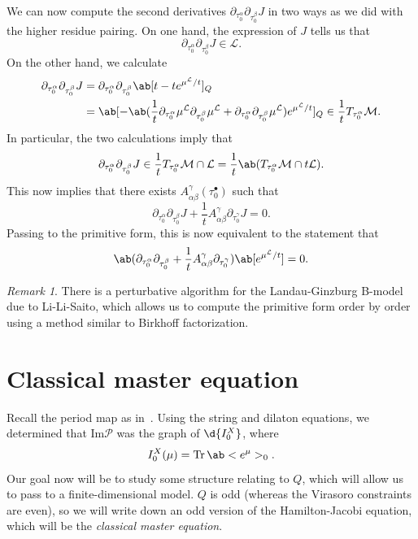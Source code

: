 \documentclass{amsart}
\theoremstyle{definition}
\theoremstyle{remark}
\newtheorem{rmk}[thm]{Remark}
\theoremstyle{plain}
\theoremstyle{definition}
\theoremstyle{remark}
\newcommand{\Ima}{\mathrm{Im}}
\newcommand{\mc}[1]{\mathcal{#1}}
\newcommand{\on}[1]{\operatorname{#1}}
\newcommand{\1}{\mathbf{1}}
\newcommand{\2}{\mathbf{2}}
\newcommand{\3}{\mathbf{3}}
\begin{document}
We can now compute the second derivatives \(\partial_{\tau_0^{\alpha}} \partial_{\tau_0^{\beta}} J\) in two ways as we did with the higher residue pairing. On one hand, the expression of \(J\) tells us that
\[ \partial_{\tau_0^{\alpha}} \partial_{\tau_0^{\beta}} J \in \mc{L}. \]
On the other hand, we calculate
\begin{align*}
    \partial_{\tau_0^{\alpha}} \partial_{\tau_0^{\beta}} J &= \partial_{\tau_0^{\alpha}} \partial_{\tau_0^{\beta}} \ab[t - t e^{\mu^{\mc{L}}/t}]_Q \\
    &= \ab[- \ab(\frac{1}{t} \partial_{\tau_0^{\alpha}} \mu^{\mc{L}} \partial_{\tau_0^{\beta}} \mu^{\mc{L}} + \partial_{\tau_0^{\alpha}} \partial_{\tau_0^{\beta}} \mu^{\mc{L}}) e^{\mu^{\mc{L}}/t}]_Q \in \frac{1}{t} T_{\tau_0^{\alpha}} \mc{M}. 
\end{align*}
In particular, the two calculations imply that
\[ \partial_{\tau_0^{\alpha}} \partial_{\tau_0^{\beta}} J \in \frac{1}{t} T_{\tau_0^{\alpha}} \mc{M} \cap \mc{L} = \frac{1}{t} \ab( T_{\tau_0^{\alpha}} \mc{M} \cap t \mc{L}). \]
This now implies that there exists \(A_{\alpha\beta}^{\gamma}(\tau_0^{\bullet})\) such that 
\[ \partial_{\tau_0^{\alpha}} \partial_{\tau_0^{\beta}} J + \frac{1}{t} A_{\alpha\beta}^{\gamma} \partial_{\tau_0^{\gamma}} J = 0. \]
Passing to the primitive form, this is now equivalent to the statement that
\[ \ab(\partial_{\tau_0^{\alpha}} \partial_{\tau_0^{\beta}} + \frac{1}{t} A_{\alpha\beta}^{\gamma} \partial_{\tau_0^{\gamma}}) \ab[e^{\mu^{\mc{L}}/t}] = 0. \]

\begin{rmk}
    There is a perturbative algorithm for the Landau-Ginzburg B-model due to Li-Li-Saito, which allows us to compute the primitive form order by order using a method similar to Birkhoff factorization.
\end{rmk}



\section{Classical master equation}%
\label{sec:Classical master equation}

Recall the period map as in~. Using the string and dilaton equations, we determined that \(\Ima \mc{P}\) was the graph of \(\d{I_0^X}\), where
\[ I_0^X (\mu) = \on{Tr} \ab<e^{\mu}>_0. \]
Our goal now will be to study some structure relating to \(Q\), which will allow us to pass to a finite-dimensional model. \(Q\) is odd (whereas the Virasoro constraints are even), so we will write down an odd version of the Hamilton-Jacobi equation, which will be the \textit{classical master equation}.
\end{document}
